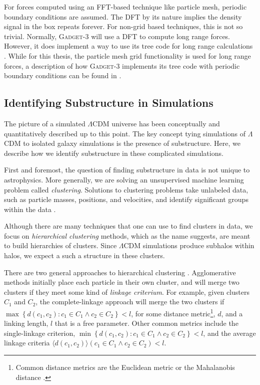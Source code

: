 For forces computed using an FFT-based technique like particle mesh, periodic boundary conditions are assumed. The DFT by its nature implies the density signal in the box repeats forever. For non-grid based techniques, this is not so trivial. Normally, \textsc{Gadget-3} will use a DFT to compute long range forces. However, it does implement a way to use its tree code for long range calculations \citep{GadgetCodePaper}. While for this thesis, the particle mesh grid functionality is used for long range forces, a description of how \textsc{Gadget-3} implements its tree code with periodic boundary conditions can be found in \citet{hernquist_1991}.

\subsection{Identifying Substructure in Simulations}


The picture of a simulated $\Lambda$CDM universe has been conceptually and quantitatively described up to this point. The key concept tying simulations of $\Lambda$CDM to isolated galaxy simulations is the presence of substructure. Here, we describe how we identify substructure in these complicated simulations. 

First and foremost, the question of finding substructure in data is not unique to astrophysics. More generally, we are solving an unsupervised machine learning problem called \textit{clustering}. Solutions to clustering problems take unlabeled data, such as particle masses, positions, and velocities, and identify significant groups within the data \citep{statistical_learning_r}. 

Although there are many techniques that one can use to find clusters in data, we focus on \textit{hierarchical clustering} methods, which as the name suggests, are meant to build hierarchies of clusters. Since $\Lambda$CDM simulations produce subhalos within halos, we expect a such a structure in these clusters.

There are two general approaches to hierarchical clustering \citep{statistical_learning_r}. Agglomerative methods initially place each particle in their own cluster, and will merge two clusters if they meet some kind of \textit{linkage criterium}. For example, given clusters $C_1$ and $C_2$, the complete-linkage approach will merge the two clusters if $\max\left\{ d(c_1, c_2) : c_1 \in C_1 \wedge c_2 \in C_2\right\} < l$, for some distance metric\footnote{Common distance metrics are the Euclidean metric or the Mahalanobis distance \citep{statistical_learning_r}.}, $d$,  and a linking length, $l$ that is a free parameter. Other common metrics include the single-linkage criterion, $\min\left\{ d(c_1, c_2) : c_1 \in C_1 \wedge c_2 \in C_2\right\} < l$, and the average linkage criteria $\langle d(c_1,c_2) \rangle \left (c_1 \in C_1 \wedge c_2 \in C_2\right) < l$.

